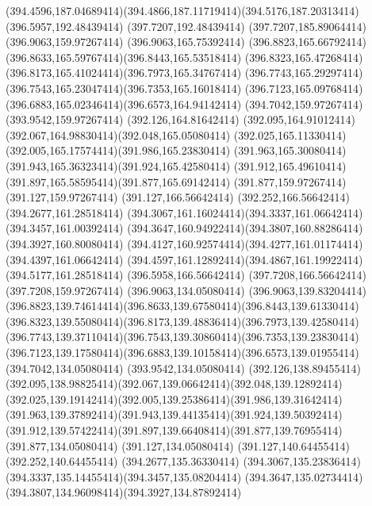 {{	\curveto(394.4596,187.04689414)(394.4866,187.11719414)(394.5176,187.20313414)
	\lineto(396.5957,192.48439414)
	\lineto(397.7207,192.48439414)
	\lineto(397.7207,185.89064414)
	\closepath
	\moveto(396.9063,159.97267414)
	\lineto(396.9063,165.75392414)
	\curveto(396.8823,165.66792414)(396.8633,165.59767414)(396.8443,165.53518414)
	\curveto(396.8323,165.47268414)(396.8173,165.41024414)(396.7973,165.34767414)
	\curveto(396.7743,165.29297414)(396.7543,165.23047414)(396.7353,165.16018414)
	\curveto(396.7123,165.09768414)(396.6883,165.02346414)(396.6573,164.94142414)
	\lineto(394.7042,159.97267414)
	\lineto(393.9542,159.97267414)
	\lineto(392.126,164.81642414)
	\curveto(392.095,164.91012414)(392.067,164.98830414)(392.048,165.05080414)
	\curveto(392.025,165.11330414)(392.005,165.17574414)(391.986,165.23830414)
	\curveto(391.963,165.30080414)(391.943,165.36323414)(391.924,165.42580414)
	\curveto(391.912,165.49610414)(391.897,165.58595414)(391.877,165.69142414)
	\lineto(391.877,159.97267414)
	\lineto(391.127,159.97267414)
	\lineto(391.127,166.56642414)
	\lineto(392.252,166.56642414)
	\lineto(394.2677,161.28518414)
	\curveto(394.3067,161.16024414)(394.3337,161.06642414)(394.3457,161.00392414)
	\curveto(394.3647,160.94922414)(394.3807,160.88286414)(394.3927,160.80080414)
	\curveto(394.4127,160.92574414)(394.4277,161.01174414)(394.4397,161.06642414)
	\curveto(394.4597,161.12892414)(394.4867,161.19922414)(394.5177,161.28518414)
	\lineto(396.5958,166.56642414)
	\lineto(397.7208,166.56642414)
	\lineto(397.7208,159.97267414)
	\closepath
	\moveto(396.9063,134.05080414)
	\lineto(396.9063,139.83204414)
	\curveto(396.8823,139.74614414)(396.8633,139.67580414)(396.8443,139.61330414)
	\curveto(396.8323,139.55080414)(396.8173,139.48836414)(396.7973,139.42580414)
	\curveto(396.7743,139.37110414)(396.7543,139.30860414)(396.7353,139.23830414)
	\curveto(396.7123,139.17580414)(396.6883,139.10158414)(396.6573,139.01955414)
	\lineto(394.7042,134.05080414)
	\lineto(393.9542,134.05080414)
	\lineto(392.126,138.89455414)
	\curveto(392.095,138.98825414)(392.067,139.06642414)(392.048,139.12892414)
	\curveto(392.025,139.19142414)(392.005,139.25386414)(391.986,139.31642414)
	\curveto(391.963,139.37892414)(391.943,139.44135414)(391.924,139.50392414)
	\curveto(391.912,139.57422414)(391.897,139.66408414)(391.877,139.76955414)
	\lineto(391.877,134.05080414)
	\lineto(391.127,134.05080414)
	\lineto(391.127,140.64455414)
	\lineto(392.252,140.64455414)
	\lineto(394.2677,135.36330414)
	\curveto(394.3067,135.23836414)(394.3337,135.14455414)(394.3457,135.08204414)
	\curveto(394.3647,135.02734414)(394.3807,134.96098414)(394.3927,134.87892414)
}}
